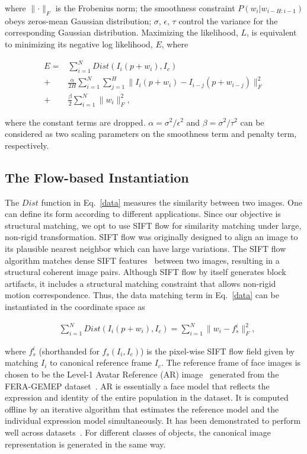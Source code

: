 \documentclass[10pt,journal]{IEEEtran}
\begin{document}
\noindent where $\parallel \cdot \parallel_F$ is the Frobenius norm; the smoothness constraint $P(w_i|w_{i-H:i-1})$ obeys zeros-mean Gaussian distribution; $\sigma$, $\epsilon$, $\tau$ control the variance for the corresponding Gaussian distribution. Maximizing the likelihood, $L$, is equivalent to minimizing its negative log likelihood, $E$, where

\begin{align}
\label{data}
E = &\sum_{i=1}^{N}Dist(I_i(p+w_i),I_c) \\
\label{smooth}
	+ &\frac{\alpha}{2H}\sum_{i=1}^{N}\sum_{j=1}^{H}\parallel{I_i(p+w_i)-I_{i-j}(p+w_{i-j})}\parallel_F^2 \\
\label{penalty}
	+ &\frac{\beta}{2}\sum_{i=1}^{N}\parallel{w_i}\parallel_F^2,
\end{align}


\noindent where the constant terms are dropped. $\alpha=\sigma^2 / \epsilon^2$ and $\beta=\sigma^2 / \tau^2$ can be considered as two scaling parameters on the smoothness term and penalty term, respectively. 

\subsection{The Flow-based Instantiation}

The $Dist$ function in Eq.~\eqref{data} measures the similarity between two images. One can define its form according to different applications. Since our objective is structural matching, we opt to use SIFT flow \cite{Liu_PAMI11} for similarity matching under large, non-rigid transformation. SIFT flow \cite{Liu_PAMI11} was originally designed to align an image to its plausible nearest neighbor which can have large variations. The SIFT flow algorithm matches dense SIFT features~\cite{SIFT} between two images, resulting in a structural coherent image pairs. Although SIFT flow by itself generates block artifacts, it includes a structural matching constraint that allows non-rigid motion correspondence. Thus, the data matching term in Eq.~\eqref{data} can be instantiated in the coordinate space as

\begin{align}
\label{data_sift}
&\sum_{i=1}^{N}Dist(I_i(p+w_i),I_c)=\sum_{i=1}^{N}\parallel{w_i-f_s^i}\parallel_F^2,
\end{align}

\noindent where $f_s^i$ (shorthanded for $f_s(I_i,I_c)$) is the pixel-wise SIFT flow field given by matching $I_i$ to canonical reference frame $I_c$. The reference frame of face images is chosen to be the Level-1 Avatar Reference (AR) image~\cite{Yang_SMCB12} generated from the FERA-GEMEP dataset~\cite{Valstar_FERA11}. AR is essentially a face model that reflects the expression and identity of the entire population in the dataset. It is computed offline by an iterative algorithm that estimates the reference model and the individual expression model simultaneously. It has been demonstrated to perform well across datasets~\cite{Yang_SMCB12}. For different classes of objects, the canonical image representation is generated in the same way.
\end{document}
